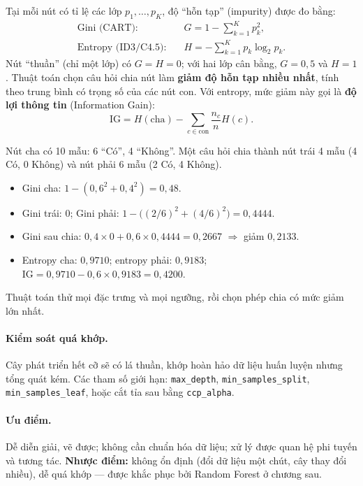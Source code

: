 Tại mỗi nút có tỉ lệ các lớp $p_1, \dots, p_K$, độ ``hỗn tạp'' (impurity) được đo bằng:
\begin{align}
    \text{Gini (CART)}: \quad & G = 1 - \sum_{k=1}^{K} p_k^2, \\
    \text{Entropy (ID3/C4.5)}: \quad & H = -\sum_{k=1}^{K} p_k \log_2 p_k .
\end{align}
Nút ``thuần'' (chỉ một lớp) có $G = H = 0$; với hai lớp cân bằng, $G = 0{,}5$ và $H = 1$. Thuật toán chọn câu hỏi chia nút làm \textbf{giảm độ hỗn tạp nhiều nhất}, tính theo trung bình có trọng số của các nút con. Với entropy, mức giảm này gọi là \textbf{độ lợi thông tin} (Information Gain):
\begin{equation}
    \mathrm{IG} = H(\text{cha}) - \sum_{c \in \text{con}} \frac{n_c}{n} H(c).
\end{equation}

\begin{example}
Nút cha có 10 mẫu: 6 ``Có'', 4 ``Không''. Một câu hỏi chia thành nút trái 4 mẫu (4 Có, 0 Không) và nút phải 6 mẫu (2 Có, 4 Không).
\begin{itemize}
    \item Gini cha: $1 - (0{,}6^2 + 0{,}4^2) = 0{,}48$.
    \item Gini trái: $0$; Gini phải: $1 - \big((2/6)^2 + (4/6)^2\big) = 0{,}4444$.
    \item Gini sau chia: $0{,}4 \times 0 + 0{,}6 \times 0{,}4444 = 0{,}2667$ $\Rightarrow$ giảm $0{,}2133$.
    \item Entropy cha: $0{,}9710$; entropy phải: $0{,}9183$; $\mathrm{IG} = 0{,}9710 - 0{,}6 \times 0{,}9183 = 0{,}4200$.
\end{itemize}
Thuật toán thử mọi đặc trưng và mọi ngưỡng, rồi chọn phép chia có mức giảm lớn nhất.
\end{example}

\paragraph{Kiểm soát quá khớp.} Cây phát triển hết cỡ sẽ có lá thuần, khớp hoàn hảo dữ liệu huấn luyện nhưng tổng quát kém. Các tham số giới hạn: \texttt{max\_depth}, \texttt{min\_samples\_split}, \texttt{min\_samples\_leaf}, hoặc cắt tỉa sau bằng \texttt{ccp\_alpha}.

\paragraph{Ưu điểm.} Dễ diễn giải, vẽ được; không cần chuẩn hóa dữ liệu; xử lý được quan hệ phi tuyến và tương tác. \textbf{Nhược điểm:} không ổn định (đổi dữ liệu một chút, cây thay đổi nhiều), dễ quá khớp --- được khắc phục bởi Random Forest ở chương sau.

